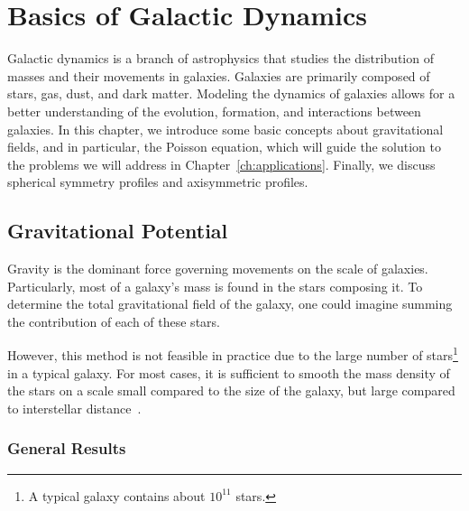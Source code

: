 \chapter{Basics of Galactic Dynamics}\label{ch:galaxies-theory}
Galactic dynamics is a branch of astrophysics that studies the distribution of masses and their movements in galaxies. Galaxies are primarily composed of stars, gas, dust, and dark matter. Modeling the dynamics of galaxies allows for a better understanding of the evolution, formation, and interactions between galaxies. In this chapter, we introduce some basic concepts about gravitational fields, and in particular, the Poisson equation, which will guide the solution to the problems we will address in Chapter~\ref{ch:applications}. Finally, we  discuss spherical symmetry profiles and axisymmetric profiles.

\section{Gravitational Potential}\label{sec:gravity}
Gravity is the dominant force governing movements on the scale of galaxies. Particularly, most of a galaxy's mass is found in the stars composing it. To determine the total gravitational field of the galaxy, one could imagine summing the contribution of each of these stars.
\par However, this method is not feasible in practice due to the large number of stars\footnote{A typical galaxy contains about $10^{11}$ stars.} in a typical galaxy. For most cases, it is sufficient to smooth the mass density of the stars on a scale small compared to the size of the galaxy, but large compared to interstellar distance~\cite{binney2011galactic}.

\subsection{General Results}

